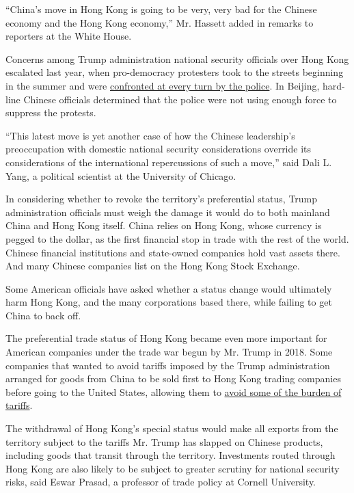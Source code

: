 ``China's move in Hong Kong is going to be very, very bad for the
Chinese economy and the Hong Kong economy,'' Mr. Hassett added in
remarks to reporters at the White House.

Concerns among Trump administration national security officials over
Hong Kong escalated last year, when pro-democracy protesters took to the
streets beginning in the summer and were
\href{https://www.nytimes3xbfgragh.onion/2019/11/13/world/asia/hong-kong-protests-students.html}{confronted
at every turn by the police}. In Beijing, hard-line Chinese officials
determined that the police were not using enough force to suppress the
protests.

``This latest move is yet another case of how the Chinese leadership's
preoccupation with domestic national security considerations override
its considerations of the international repercussions of such a move,''
said Dali L. Yang, a political scientist at the University of Chicago.

In considering whether to revoke the territory's preferential status,
Trump administration officials must weigh the damage it would do to both
mainland China and Hong Kong itself. China relies on Hong Kong, whose
currency is pegged to the dollar, as the first financial stop in trade
with the rest of the world. Chinese financial institutions and
state-owned companies hold vast assets there. And many Chinese companies
list on the Hong Kong Stock Exchange.

Some American officials have asked whether a status change would
ultimately harm Hong Kong, and the many corporations based there, while
failing to get China to back off.

The preferential trade status of Hong Kong became even more important
for American companies under the trade war begun by Mr. Trump in 2018.
Some companies that wanted to avoid tariffs imposed by the Trump
administration arranged for goods from China to be sold first to Hong
Kong trading companies before going to the United States, allowing them
to
\href{https://www.scmp.com/economy/china-economy/article/2182215/trumps-trade-war-tariffs-send-firms-hong-kong-little-known}{avoid
some of the burden of tariffs}.

The withdrawal of Hong Kong's special status would make all exports from
the territory subject to the tariffs Mr. Trump has slapped on Chinese
products, including goods that transit through the territory.
Investments routed through Hong Kong are also likely to be subject to
greater scrutiny for national security risks, said Eswar Prasad, a
professor of trade policy at Cornell University.

